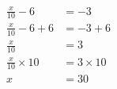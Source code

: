 \documentclass[varwidth]{standalone}
\begin{document}
    \begin{varwidth}{0.25\paperwidth}
    \begin{align*}
    \frac{x}{10} - 6 &= -3\\
    \frac{x}{10} - 6 + 6 &= -3 + 6\\
    \frac{x}{10} &= 3\\
    \frac{x}{10} \times10 &= 3 \times10\\
    x &= 30\\
\end{align*}
\end{varwidth}
\end{document}

